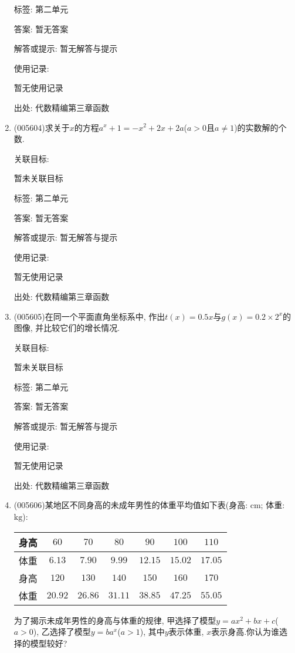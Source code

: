 \documentclass[10pt,a4paper]{article}
\begin{document}
\begin{enumerate}[1.]
标签: 第二单元

答案: 暂无答案

解答或提示: 暂无解答与提示

使用记录:

暂无使用记录


出处: 代数精编第三章函数
\item { (005604)}求关于$x$的方程$a^x+1=-x^2+2x+2a$($a>0$且$a\ne 1$)的实数解的个数.


关联目标:

暂未关联目标



标签: 第二单元

答案: 暂无答案

解答或提示: 暂无解答与提示

使用记录:

暂无使用记录


出处: 代数精编第三章函数
\item { (005605)}在同一个平面直角坐标系中, 作出$t(x)=0.5x$与$g(x)=0.2\times 2^x$的图像, 并比较它们的增长情况.


关联目标:

暂未关联目标



标签: 第二单元

答案: 暂无答案

解答或提示: 暂无解答与提示

使用记录:

暂无使用记录


出处: 代数精编第三章函数
\item { (005606)}某地区不同身高的未成年男性的体重平均值如下表(身高: $\text{cm}$; 体重: $\text{kg}$):
\begin{center}
    \begin{tabular}{|c|c|c|c|c|c|c|}
        \hline
        身高 & $60$ & $70$ & $80$ & $90$ & $100$ & $110$\\ \hline
        体重 & $6.13$ & $7.90$ & $9.99$ & $12.15$ & $15.02$ & $17.05$\\ \hline
        身高 & $120$ & $130$ & $140$ & $150$ & $160$ & $170$\\ \hline
        体重 & $20.92$ & $26.86$ & $31.11$ & $38.85$ & $47.25$ & $55.05$\\ \hline
    \end{tabular}
\end{center}
为了揭示未成年男性的身高与体重的规律, 甲选择了模型$y=ax^2+bx+c$($a>0$), 乙选择了模型$y=ba^x$($a>1$), 其中$y$表示体重, $x$表示身高.你认为谁选择的模型较好?



\end{enumerate}
\end{document}
